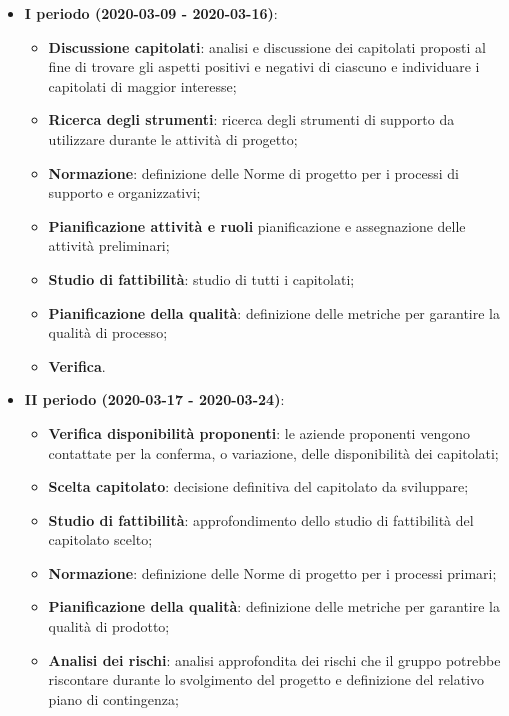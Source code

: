 \documentclass[../piano-di-progetto.tex]{subfiles}
\begin{document}
\begin{itemize}

    \item \textbf{I periodo (2020-03-09 - 2020-03-16)}:
        \begin{itemize}
            \item \textbf{Discussione capitolati}: analisi e discussione dei capitolati proposti al fine di trovare gli aspetti positivi e negativi di ciascuno e individuare i capitolati di maggior interesse;
            \item \textbf{Ricerca degli strumenti}: ricerca degli strumenti di supporto da utilizzare durante le attività di progetto;
            \item \textbf{Normazione}: definizione delle Norme di progetto per i processi di supporto e organizzativi;
            \item \textbf{Pianificazione attività e ruoli} pianificazione e assegnazione delle attività preliminari;
            \item \textbf{Studio di fattibilità}: studio di tutti i capitolati;
            \item \textbf{Pianificazione della qualità}: definizione delle metriche per garantire la qualità di processo;
            \item \textbf{Verifica}.
        \end{itemize}
        \item \textbf{II periodo (2020-03-17 - 2020-03-24)}:
            \begin{itemize}
                \item \textbf{Verifica disponibilità proponenti}: le aziende proponenti vengono contattate per la conferma, o variazione, delle disponibilità dei capitolati;
                \item \textbf{Scelta capitolato}: decisione definitiva del capitolato da sviluppare;
                \item \textbf{Studio di fattibilità}: approfondimento dello studio di fattibilità del capitolato scelto;
                \item \textbf{Normazione}: definizione delle Norme di progetto per i processi primari;
                \item \textbf{Pianificazione della qualità}: definizione delle metriche per garantire la qualità di prodotto;
                \item \textbf{Analisi dei rischi}: analisi approfondita dei rischi che il gruppo potrebbe riscontare durante lo svolgimento del progetto e definizione del relativo piano di contingenza;

\end{itemize}
\end{itemize}
\end{document}
